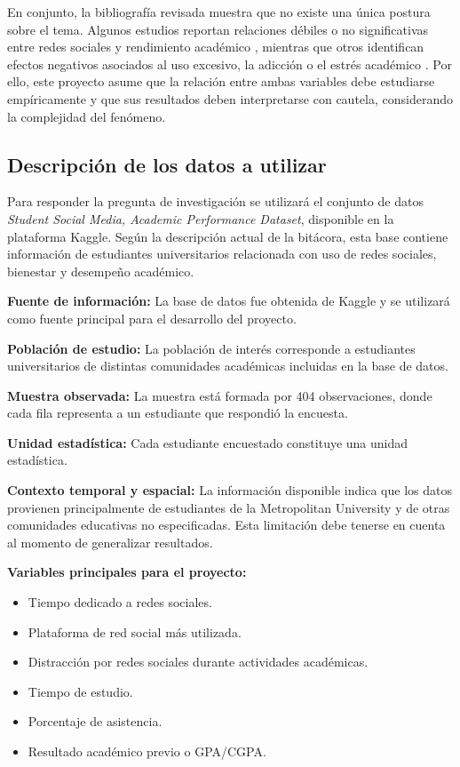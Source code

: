 \documentclass[12pt]{article}
\begin{document}
En conjunto, la bibliografía revisada muestra que no existe una única postura sobre el tema.
Algunos estudios reportan relaciones débiles o no significativas entre redes sociales y rendimiento
académico \cite{leon2023}, mientras que otros identifican efectos negativos asociados al uso
excesivo, la adicción o el estrés académico \cite{aljemely2020,ramirez2023,miranda2023}. Por
ello, este proyecto asume que la relación entre ambas variables debe estudiarse empíricamente y
que sus resultados deben interpretarse con cautela, considerando la complejidad del fenómeno.

\subsection{Descripción de los datos a utilizar}

Para responder la pregunta de investigación se utilizará el conjunto de datos
\textit{Student Social Media, Academic Performance Dataset}, disponible en la plataforma Kaggle.
Según la descripción actual de la bitácora, esta base contiene información de estudiantes
universitarios relacionada con uso de redes sociales, bienestar y desempeño académico.

\textbf{Fuente de información:} La base de datos fue obtenida de Kaggle y se utilizará como
fuente principal para el desarrollo del proyecto.

\textbf{Población de estudio:} La población de interés corresponde a estudiantes universitarios
de distintas comunidades académicas incluidas en la base de datos.

\textbf{Muestra observada:} La muestra está formada por 404 observaciones, donde cada fila
representa a un estudiante que respondió la encuesta.

\textbf{Unidad estadística:} Cada estudiante encuestado constituye una unidad estadística.

\textbf{Contexto temporal y espacial:} La información disponible indica que los datos provienen
principalmente de estudiantes de la Metropolitan University y de otras comunidades educativas no
especificadas. Esta limitación debe tenerse en cuenta al momento de generalizar resultados.

\textbf{Variables principales para el proyecto:}
\begin{itemize}
    \item Tiempo dedicado a redes sociales.
    \item Plataforma de red social más utilizada.
    \item Distracción por redes sociales durante actividades académicas.
    \item Tiempo de estudio.
    \item Porcentaje de asistencia.
    \item Resultado académico previo o GPA/CGPA.
\end{itemize}
\end{document}
